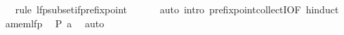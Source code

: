 \begin{isabellebody}
\ \ \ \ \isamarkupfalse%
\ {\isacharparenleft}{\kern0pt}rule\ lfp{\isacharunderscore}{\kern0pt}subset{\isacharunderscore}{\kern0pt}if{\isacharunderscore}{\kern0pt}prefixpoint{\isacharparenright}{\kern0pt}\isanewline
\ \ \ \ \ \ {\isacharparenleft}{\kern0pt}auto\ intro{\isacharbang}{\kern0pt}{\isacharcolon}{\kern0pt}\ prefixpoint{\isacharunderscore}{\kern0pt}collectI{\isacharbrackleft}{\kern0pt}OF\ h{\isacharunderscore}{\kern0pt}induct{\isacharbrackright}{\kern0pt}{\isacharparenright}{\kern0pt}\isanewline
\ \ \isamarkupfalse%
\ a{\isacharunderscore}{\kern0pt}mem{\isacharunderscore}{\kern0pt}lfp\ \isamarkupfalse%
\ {\isachardoublequoteopen}P\ a{\isachardoublequoteclose}\ \isamarkupfalse%
\ auto\isanewline
{}\isamarkupfalse%
%
\endisatagproof
{\isafoldproof}%
%
\isadelimproof
\isanewline
%
\endisadelimproof
\isanewline
{}\isamarkupfalse%
\isanewline
\isanewline
%
\isadelimtheory
\isanewline
%
\endisadelimtheory
%
\isatagtheory
{}\isamarkupfalse%
%
\endisatagtheory
{\isafoldtheory}%
%
\isadelimtheory
%
\endisadelimtheory
%
\end{isabellebody}%
\endinput
